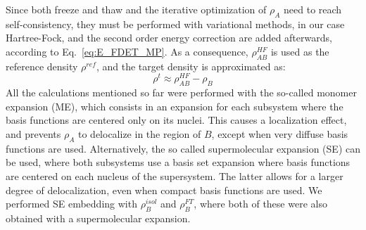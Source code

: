 \documentclass[journal=jctcce,manuscript=article, layout=twocolumn]{achemso}
\begin{document}
Since both freeze and thaw and the iterative optimization of $\rho_A$ need to reach self-consistency, they must be performed with variational methods, in our case Hartree-Fock, and the second order energy correction are added afterwards, according to Eq.~\ref{eq:E_FDET_MP}. As a consequence, $\rho_{AB}^{HF}$ is used as the reference density $\rho^{ref}$, and the target density is approximated as:
\begin{equation}
 \rho^t \approx \rho_{AB}^{HF} - \rho_B
\end{equation}
All the calculations mentioned so far were performed with the so-called monomer expansion (ME), which consists in an expansion for each subsystem where the basis functions are centered only on its nuclei. This causes a localization effect, and prevents $\rho_A$ to delocalize in the region of $B$, except when very diffuse basis functions are used.
Alternatively, the so called supermolecular expansion (SE) can be used, where both subsystems use a basis set expansion where basis functions are centered on each nucleus of the supersystem. The latter allows for a larger degree of delocalization, even when compact basis functions are used. We performed SE embedding with $\rho_B^{isol}$ and $\rho_B^{FT}$, where both of these were also obtained with a supermolecular expansion.
\end{document}
